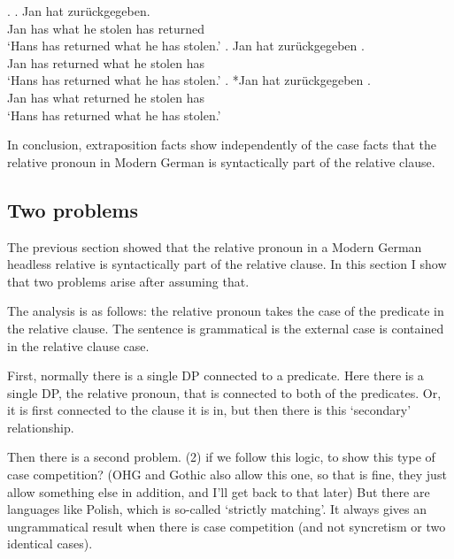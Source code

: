 \ex.\label{ex:extra-headless}
\ag. Jan hat     zurückgegeben.\\
Jan has what he stolen has returned\\
`Hans has returned what he has stolen.' \citet[185]{groos1981}\label{ex:extra-headless-base}
\bg. Jan hat zurückgegeben    .\\
Jan has returned what he stolen has\\
`Hans has returned what he has stolen.' \citet[185]{groos1981}\label{ex:extra-headless-clause}
\bg. *Jan hat  zurückgegeben   .\\
Jan has what returned he stolen has\\
`Hans has returned what he has stolen.' \citet[185]{groos1981}\label{ex:extra-headless-no-rel}


In conclusion, extraposition facts show independently of the case facts that the relative pronoun in Modern German is syntactically part of the relative clause.


\subsection{Two problems}

The previous section showed that the relative pronoun in a Modern German headless relative is syntactically part of the relative clause. In this section I show that two problems arise after assuming that.

The analysis is as follows: the relative pronoun takes the case of the predicate in the relative clause. The sentence is grammatical is the external case is contained in the relative clause case.

First, normally there is a single DP connected to a predicate. Here there is a single DP, the relative pronoun, that is connected to both of the predicates. Or, it is first connected to the clause it is in, but then there is this `secondary' relationship.

Then there is a second problem.
(2) if we follow this logic, to show this type of case competition? (OHG and Gothic also allow this one, so that is fine, they just allow something else in addition, and I'll get back to that later) But there are languages like Polish, which is so-called `strictly matching'. It always gives an ungrammatical result when there is case competition (and not syncretism or two identical cases).


